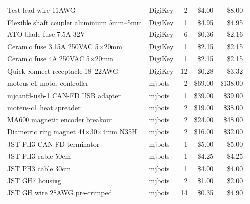 \begin{longtable}{p{7cm} l r r r}
	Test lead wire 16AWG                               & DigiKey           & 2            & \$4.00              & \$8.00         \\
	Flexible shaft coupler aluminium 5mm--5mm          & DigiKey           & 1            & \$4.95              & \$4.95         \\
	ATO blade fuse 7.5A 32V                            & DigiKey           & 6            & \$0.36              & \$2.16         \\
	Ceramic fuse 3.15A 250VAC 5$\times$20mm            & DigiKey           & 1            & \$2.15              & \$2.15         \\
	Ceramic fuse 4A 250VAC 5$\times$20mm               & DigiKey           & 1            & \$2.15              & \$2.15         \\
	Quick connect receptacle 18--22AWG                 & DigiKey           & 12           & \$0.28              & \$3.32         \\
	moteus-c1 motor controller                         & mjbots            & 2            & \$69.00             & \$138.00       \\
	mjcanfd-usb-1 CAN-FD USB adapter                   & mjbots            & 1            & \$39.00             & \$39.00        \\
	moteus-c1 heat spreader                            & mjbots            & 2            & \$19.00             & \$38.00        \\
	MA600 magnetic encoder breakout                    & mjbots            & 2            & \$24.00             & \$48.00        \\
	Diametric ring magnet 44$\times$30$\times$4mm N35H & mjbots            & 2            & \$16.00             & \$32.00        \\
	JST PH3 CAN-FD terminator                          & mjbots            & 1            & \$5.00              & \$5.00         \\
	JST PH3 cable 50cm                                 & mjbots            & 1            & \$4.25              & \$4.25         \\
	JST PH3 cable 30cm                                 & mjbots            & 1            & \$4.00              & \$4.00         \\
	JST GH7 housing                                    & mjbots            & 2            & \$1.00              & \$2.00         \\
	JST GH wire 28AWG pre-crimped                      & mjbots            & 14           & \$0.35              & \$4.90         \\
	\hline
\end{longtable}

